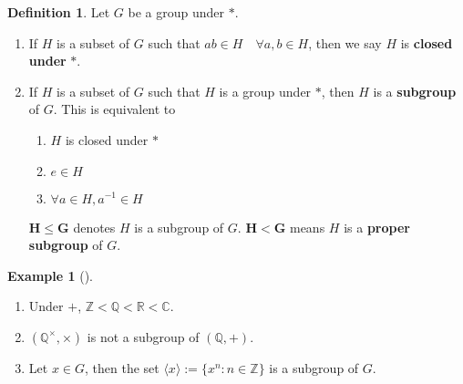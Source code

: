 \documentclass{article}
\theoremstyle{definition}
\newtheorem{ex}{Example}
\newtheorem{dfn}{Definition}
\newenvironment{exs}[1][]{%
  \begin{ex}[#1]$ $\par\nobreak\ignorespaces
}{%
  \end{ex}
}
\newcommand{\bracket}[1]{\langle #1 \rangle}
\newcommand{\CC}{\mathbb C}
\newcommand{\QQ}{\mathbb Q}
\newcommand{\RR}{\mathbb R}
\newcommand{\ZZ}{\mathbb Z}
\begin{document}
\begin{dfn}
	Let $G$ be a group under $*$.
	\begin{enumerate}
		\item[(1)] If $H$ is a subset of $G$ such that $ab \in H \quad \forall a, b \in H$, then we say $H$ is \textbf{closed under } $\bm{*}$.

		\item[(2)] If $H$ is a subset of $G$ such that $H$ is a group under $*$, then $H$ is a \textbf{subgroup} of $G$.
			This is equivalent to 
			\begin{enumerate}
				\item[(i)] $H$ is closed under $*$

				\item[(ii)] $e \in H$

				\item[(iii)] $\forall a \in H, a^{-1} \in H$
			\end{enumerate}
			$\bm{H \leq G}$ denotes $H$ is a subgroup of $G$.
			$\bm{H < G}$ means $H$ is a \textbf{proper subgroup} of $G$.
	\end{enumerate}
\end{dfn}

\begin{exs}
	\begin{enumerate}
		\item[(1)] Under $+$, $\ZZ < \QQ < \RR < \CC$.

		\item[(2)] $(\QQ^\times, \times)$ is not a subgroup of $(\QQ, +)$.

		\item[(3)] Let $x \in G$, then the set $\bracket{x} := \{x^n: n \in \ZZ\}$ is a subgroup of $G$.
	\end{enumerate}
\end{exs}
\end{document}
